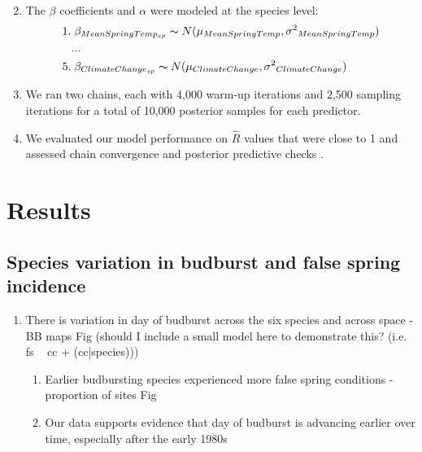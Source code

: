 \documentclass{article}\usepackage[]{graphicx}\usepackage[]{color}
\begin{document}
\begin{enumerate}
\begin{align*}
\end{align*}
\item The $\beta$ coefficients and $\alpha$ were modeled at the species level:
\begin{align*}
1.& \; \beta_{MeanSpringTemp_{sp}} \thicksim N(\mu_{MeanSpringTemp}, \sigma{^2}_{MeanSpringTemp}) \\
   &... \\
5.& \; \beta_{ClimateChange_{sp}} \thicksim N(\mu_{ClimateChange}, \sigma{^2}_{ClimateChange})
\end{align*}
\item We ran two chains, each with 4,000 warm-up iterations and 2,500 sampling iterations for a total of 10,000 posterior samples for each predictor. 
\item We evaluated our model performance on $\hat{R}$ values that were close to 1 and assessed chain convergence and posterior predictive checks \citep{Gelman2006}.

\end{enumerate}

\section*{Results}
\subsection*{Species variation in budburst and false spring incidence}
\begin{enumerate}
\item There is variation in day of budburst across the six species and across space - BB maps Fig (should I include a small model here to demonstrate this? (i.e. fs ~ cc + (cc|species)))
\begin{enumerate}
\item Earlier budbursting species experienced more false spring conditions - proportion of sites Fig
\item Our data supports evidence that day of budburst is advancing earlier over time, especially after the early 1980s
\end{enumerate}
\end{enumerate}
\end{document}
